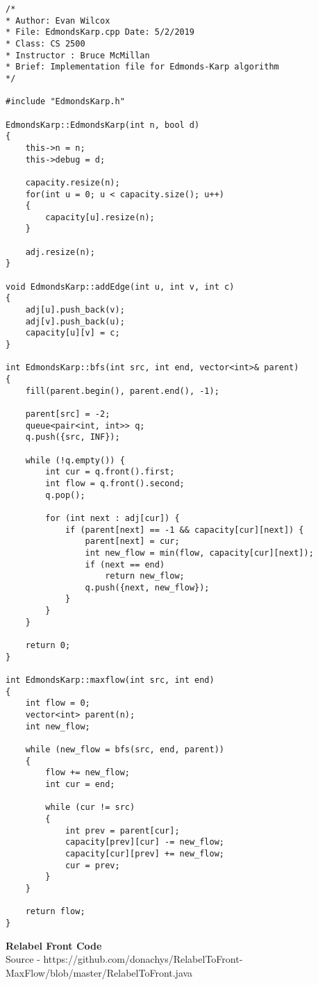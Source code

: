 \documentclass[a4paper]{article}
\begin{document}
    \begin{verbatim}
/*
* Author: Evan Wilcox
* File: EdmondsKarp.cpp Date: 5/2/2019
* Class: CS 2500
* Instructor : Bruce McMillan
* Brief: Implementation file for Edmonds-Karp algorithm
*/

#include "EdmondsKarp.h"

EdmondsKarp::EdmondsKarp(int n, bool d)
{
    this->n = n;
    this->debug = d;

    capacity.resize(n);
    for(int u = 0; u < capacity.size(); u++)
    {
        capacity[u].resize(n);
    }

    adj.resize(n);
}

void EdmondsKarp::addEdge(int u, int v, int c)
{
    adj[u].push_back(v);
    adj[v].push_back(u);
    capacity[u][v] = c;
}

int EdmondsKarp::bfs(int src, int end, vector<int>& parent) 
{
    fill(parent.begin(), parent.end(), -1);
    
    parent[src] = -2;
    queue<pair<int, int>> q;
    q.push({src, INF});
    
    while (!q.empty()) {
        int cur = q.front().first;
        int flow = q.front().second;
        q.pop();

        for (int next : adj[cur]) {
            if (parent[next] == -1 && capacity[cur][next]) {
                parent[next] = cur;
                int new_flow = min(flow, capacity[cur][next]);
                if (next == end)
                    return new_flow;
                q.push({next, new_flow});
            }
        }
    }

    return 0;
}

int EdmondsKarp::maxflow(int src, int end) 
{
    int flow = 0;
    vector<int> parent(n);
    int new_flow;
    
    while (new_flow = bfs(src, end, parent)) 
    {
        flow += new_flow;
        int cur = end;

        while (cur != src) 
        {
            int prev = parent[cur];
            capacity[prev][cur] -= new_flow;
            capacity[cur][prev] += new_flow;
            cur = prev;
        }
    }

    return flow;
}
    \end{verbatim}

    \newpage
    \textbf{Relabel Front Code} \\ 
    Source - https://github.com/donachys/RelabelToFront-MaxFlow/blob/master/RelabelToFront.java
\end{document}
